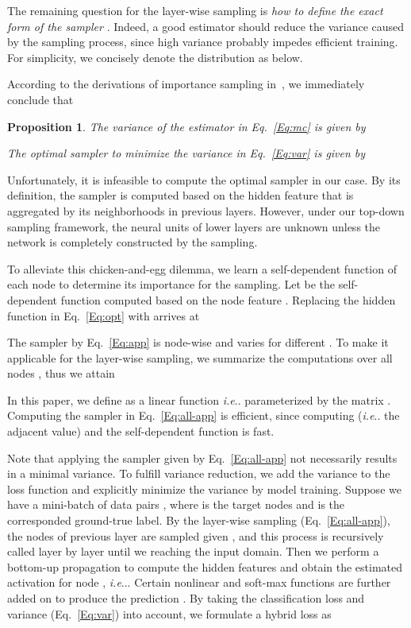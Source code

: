 \documentclass{article}
\makeatletter
\DeclareRobustCommand\onedot{\futurelet\@let@token\@onedot}
\def\@onedot{\ifx\@let@token.\else.\null\fi\xspace}
\def\ie{\emph{i.e}\onedot} \def\Ie{\emph{I.e}\onedot}
\newtheorem{proposition}[theorem]{Proposition}
\makeatother
\begin{document}
The remaining question for the layer-wise sampling is \emph{how to define the exact form of the sampler }. Indeed, a good estimator should reduce the variance caused by the sampling process, since high variance probably impedes efficient training. For simplicity, we concisely denote the distribution  as  below.






According to the derivations of importance sampling in~\cite{mcbook}, we immediately conclude that
\begin{proposition}
\label{Pro:varaince}
The variance of the estimator  in Eq.~\eqref{Eq:mc} is given by
\vskip -0.2in

\vskip -0.1in
The optimal sampler to minimize the variance  in Eq.~\eqref{Eq:var} is given by
\vskip -0.2in

\vskip -0.4in
\end{proposition}


Unfortunately, it is infeasible to compute the optimal sampler in our case. By its definition, the sampler  is computed based on the hidden feature  that is aggregated by its neighborhoods in previous layers. However, under our top-down sampling framework, the neural units of lower layers are unknown unless the network is completely constructed by the sampling.

To alleviate this chicken-and-egg dilemma, we learn a self-dependent function of each node to determine its importance for the sampling. Let  be the self-dependent function computed based on the node feature . Replacing the hidden function in Eq.~\eqref{Eq:opt} with  arrives at
\vskip -0.2in

\vskip -0.1in

The sampler by Eq.~\eqref{Eq:app} is node-wise and varies for different . To make it applicable for the layer-wise sampling, we summarize the computations over all nodes , thus we attain
\vskip -0.2in

\vskip -0.1in
In this paper, we define  as a linear function \ie  parameterized by the matrix .
Computing the sampler in Eq.~\eqref{Eq:all-app} is efficient, since computing   (\ie the adjacent value) and the self-dependent function  is fast.


Note that applying the sampler given by Eq.~\eqref{Eq:all-app} not necessarily results in a minimal variance.
To fulfill variance reduction, we add the variance to the loss function and explicitly minimize the variance by model training.
Suppose we have a mini-batch of data pairs , where  is the target nodes and  is the corresponded ground-true label. By the layer-wise sampling (Eq.~\eqref{Eq:all-app}), the nodes of previous layer are sampled given , and this process is recursively called layer by layer until we reaching the input domain. Then we perform a bottom-up propagation to compute the hidden features and obtain the estimated activation for node , \ie . Certain nonlinear and soft-max functions are further added on  to produce the prediction .
By taking the classification loss and variance (Eq.~\eqref{Eq:var}) into account, we formulate a hybrid loss as
\vskip -0.2in
\end{document}
